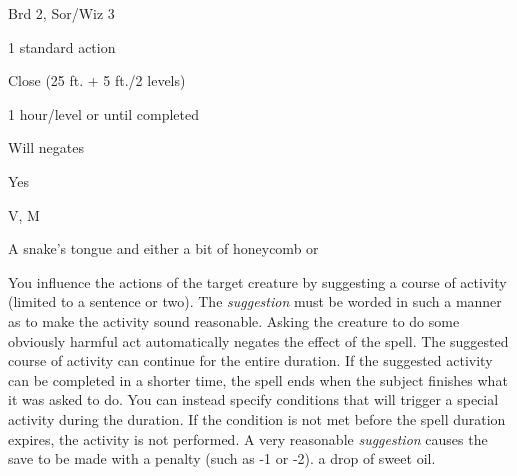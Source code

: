 
\begin{description*}
\item[Level:] Brd 2, Sor/Wiz 3
\item[Casting Time:] 1 standard action
\item[Range:] Close (25 ft. + 5 ft./2 levels)
\item[Duration:] 1 hour/level or until completed
\item[Saving Throw:] Will negates
\item[Spell Resistance:] Yes
\item[Components:] V, M
\item[Arcane Material Component:] A snake's tongue and either a bit of honeycomb or
\end{description*}

You influence the actions of the target creature by suggesting a course of activity
(limited to a sentence or two). The \textit{suggestion} must be worded in such
a manner as to make the activity sound reasonable. Asking the creature to do some
obviously harmful act automatically negates the effect of the spell.
The suggested course of activity can continue for the entire duration. If the suggested
activity can be completed in a shorter time, the spell ends when the subject finishes
what it was asked to do. You can instead specify conditions that will trigger a
special activity during the duration. If the condition is not met before the spell
duration expires, the activity is not performed.
A very reasonable \textit{suggestion} causes the save to be made with a penalty
(such as -1 or -2).
a drop of sweet oil.